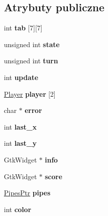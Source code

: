 \subsection*{Atrybuty publiczne}
\begin{DoxyCompactItemize}
\item 
int {\bfseries tab} \mbox{[}7\mbox{]}\mbox{[}7\mbox{]}\hypertarget{structboard_a1fec2ea31b5f84e51e480ee7124e21dd}{}\label{structboard_a1fec2ea31b5f84e51e480ee7124e21dd}

\item 
unsigned int {\bfseries state}\hypertarget{structboard_a4bdf7e0cd3652096d965adc19bd8832c}{}\label{structboard_a4bdf7e0cd3652096d965adc19bd8832c}

\item 
unsigned int {\bfseries turn}\hypertarget{structboard_a5253e1b4538cace8c76b0ea1ceded4b3}{}\label{structboard_a5253e1b4538cace8c76b0ea1ceded4b3}

\item 
int {\bfseries update}\hypertarget{structboard_a95e163830d33ed01b87452d250919820}{}\label{structboard_a95e163830d33ed01b87452d250919820}

\item 
\hyperlink{structplayer}{Player} {\bfseries player} \mbox{[}2\mbox{]}\hypertarget{structboard_a130c34c1f03cd17f11fcf81083526922}{}\label{structboard_a130c34c1f03cd17f11fcf81083526922}

\item 
char $\ast$ {\bfseries error}\hypertarget{structboard_a94b1302fd63bb9b017d0a9af33840bb3}{}\label{structboard_a94b1302fd63bb9b017d0a9af33840bb3}

\item 
int {\bfseries last\+\_\+x}\hypertarget{structboard_a227249cb7c1b1379e9dd2d5c5b652216}{}\label{structboard_a227249cb7c1b1379e9dd2d5c5b652216}

\item 
int {\bfseries last\+\_\+y}\hypertarget{structboard_a2f14ddf3a3a7b4e145578bbcfc9a73ee}{}\label{structboard_a2f14ddf3a3a7b4e145578bbcfc9a73ee}

\item 
Gtk\+Widget $\ast$ {\bfseries info}\hypertarget{structboard_adf62f066ab1743df1e6c44550c70f9e0}{}\label{structboard_adf62f066ab1743df1e6c44550c70f9e0}

\item 
Gtk\+Widget $\ast$ {\bfseries score}\hypertarget{structboard_a05d95ee8ddfc53f3358d3a8e45b7b65b}{}\label{structboard_a05d95ee8ddfc53f3358d3a8e45b7b65b}

\item 
\hyperlink{structpipes}{Pipes\+Ptr} {\bfseries pipes}\hypertarget{structboard_aef3b34c8c45a5d639ea1aba23f94b912}{}\label{structboard_aef3b34c8c45a5d639ea1aba23f94b912}

\item 
int {\bfseries color}\hypertarget{structboard_a8ab755e152d7db496709368179df93fa}{}\label{structboard_a8ab755e152d7db496709368179df93fa}

\end{DoxyCompactItemize}


